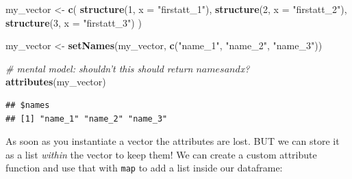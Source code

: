 \documentclass[]{book}
\newenvironment{Shaded}{\begin{snugshade}}{\end{snugshade}}
\newcommand{\CommentTok}[1]{\textcolor[rgb]{0.56,0.35,0.01}{\textit{#1}}}
\newcommand{\ControlFlowTok}[1]{\textcolor[rgb]{0.13,0.29,0.53}{\textbf{#1}}}
\newcommand{\DataTypeTok}[1]{\textcolor[rgb]{0.13,0.29,0.53}{#1}}
\newcommand{\DecValTok}[1]{\textcolor[rgb]{0.00,0.00,0.81}{#1}}
\newcommand{\KeywordTok}[1]{\textcolor[rgb]{0.13,0.29,0.53}{\textbf{#1}}}
\newcommand{\NormalTok}[1]{#1}
\newcommand{\OperatorTok}[1]{\textcolor[rgb]{0.81,0.36,0.00}{\textbf{#1}}}
\newcommand{\StringTok}[1]{\textcolor[rgb]{0.31,0.60,0.02}{#1}}
\begin{document}
\begin{Shaded}
\begin{Highlighting}[]
\NormalTok{my_vector <-}\StringTok{ }\KeywordTok{c}\NormalTok{(}
  \KeywordTok{structure}\NormalTok{(}\DecValTok{1}\NormalTok{, }\DataTypeTok{x =} \StringTok{"firstatt_1"}\NormalTok{),}
  \KeywordTok{structure}\NormalTok{(}\DecValTok{2}\NormalTok{, }\DataTypeTok{x =} \StringTok{"firstatt_2"}\NormalTok{), }
  \KeywordTok{structure}\NormalTok{(}\DecValTok{3}\NormalTok{, }\DataTypeTok{x =} \StringTok{"firstatt_3"}\NormalTok{)}
\NormalTok{)}

\NormalTok{my_vector <-}\StringTok{ }\KeywordTok{setNames}\NormalTok{(my_vector, }\KeywordTok{c}\NormalTok{(}\StringTok{"name_1"}\NormalTok{, }\StringTok{"name_2"}\NormalTok{, }\StringTok{"name_3"}\NormalTok{))}

\CommentTok{# mental model: shouldn't this should return $names and $x?}
\KeywordTok{attributes}\NormalTok{(my_vector)}
\end{Highlighting}
\end{Shaded}

\begin{verbatim}
## $names
## [1] "name_1" "name_2" "name_3"
\end{verbatim}

As soon as you instantiate a vector the attributes are lost. BUT we can store it as a list \emph{within} the vector to keep them! We can create a custom attribute function and use that with \texttt{map} to add a list inside our dataframe:

\begin{Shaded}
\end{Shaded}
\end{document}
